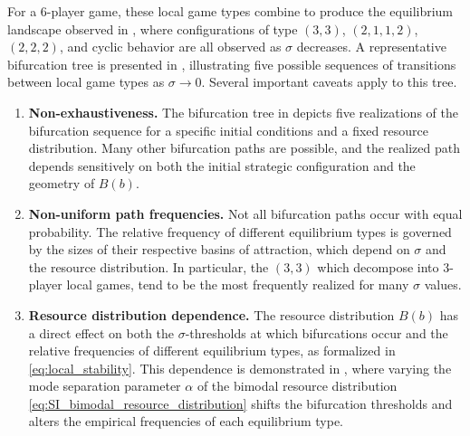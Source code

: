 \documentclass{article}
\begin{document}
                For a 6-player game, these local game types combine to produce the equilibrium landscape observed in , where configurations of type $(3,3)$, $(2,1,1,2)$, $(2,2,2)$, and cyclic behavior are all observed as $\sigma$ decreases. A representative bifurcation tree is presented in , illustrating five possible sequences of transitions between local game types as $\sigma \to 0$. Several important caveats apply to this tree.

                \begin{enumerate}[label=(\roman*)]
                    \item \textbf{Non-exhaustiveness.} The bifurcation tree in  depicts five realizations of the bifurcation sequence for a specific initial conditions and a fixed resource distribution. Many other bifurcation paths are possible, and the realized path depends sensitively on both the initial strategic configuration and the geometry of $B(b)$.

                    \item \textbf{Non-uniform path frequencies.} Not all bifurcation paths occur with equal probability. The relative frequency of different equilibrium types is governed by the sizes of their respective basins of attraction, which depend on $\sigma$ and the resource distribution. In particular, the $(3,3)$ which decompose into 3-player local games, tend to be the most frequently realized for many $\sigma$ values.

                    \item \textbf{Resource distribution dependence.} The resource distribution $B(b)$ has a direct effect on both the $\sigma$-thresholds at which bifurcations occur and the relative frequencies of different equilibrium types, as formalized in \cref{eq:local_stability}. This dependence is demonstrated in , where varying the mode separation parameter $\alpha$ of the bimodal resource distribution \cref{eq:SI_bimodal_resource_distribution} shifts the bifurcation thresholds and alters the empirical frequencies of each equilibrium type.
                \end{enumerate}
                    
\end{document}
